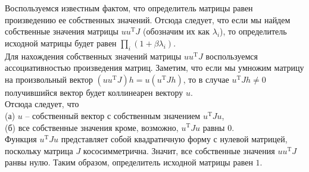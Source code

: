 \documentclass{article}
\begin{document}
Воспользуемся известным фактом, что определитель матрицы равен произведению ее собственных значений. Отсюда следует, что если мы найдем собственные значения 
матрицы $u u^{\mathrm{T}} J$ (обозначим их как $\lambda_i$), то определитель исходной матрицы будет равен $\prod\limits_i (1 + \beta \lambda_i)$.\\
Для нахождения собственных значений матрицы $u u^{\mathrm{T}} J$ воспользуемся ассоциативностью произведения матриц. Заметим, что если мы умножим матрицу на произвольный 
вектор $(u u^{\mathrm{T}} J) h = u (u^{\mathrm{T}} J h)$, то в случае $u^{\mathrm{T}} J h \neq 0$ получившийся вектор будет коллинеарен вектору $u$.\\
Отсюда следует, что\\
(а) $u$ -- собственный вектор с собственным значением $u^{\mathrm{T}} J u$,\\
(б) все собственные значения кроме, возможно, $u^{\mathrm{T}} J u$ равны $0$.\\
Функция $u^{\mathrm{T}} J u$ представляет собой квадратичную форму с нулевой матрицей, поскольку матрица $J$ кососимметрична. Значит, все собственные значения $u u^{\mathrm{T}} J$ ранвы нулю.
Таким образом, определитель исходной матрицы равен $1$.
\end{document}
